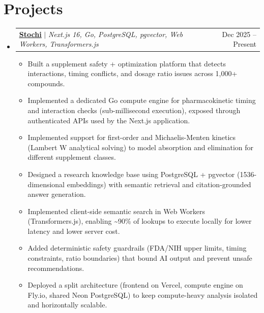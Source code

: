 \documentclass[a4paper,10pt]{article}
\makeatletter
\newcommand{\resumeItem}[1]{%
  \item\small{#1\vspace{-1pt}}%
}
\newcommand{\resumeProjectHeading}[2]{%
  \item
  \begin{tabular*}{0.97\textwidth}{l@{\extracolsep{\fill}}r}
    \small #1 & #2 \\
  \end{tabular*}\vspace{-6pt}%
}
\newcommand{\resumeItemListStart}{\begin{itemize}[itemsep=2pt]}
\newcommand{\resumeItemListEnd}{\end{itemize}\vspace{-2pt}}
\makeatother
\begin{document}
\section{Projects}
\begin{itemize}[leftmargin=0.15in, label={}]

  \resumeProjectHeading
    {\textbf{\href{https://github.com/nikitalobanov12/stochi}{\underline{Stochi}}}
    $|$ \emph{Next.js 16, Go, PostgreSQL, pgvector, Web Workers, Transformers.js}}{Dec 2025 -- Present}
  \resumeItemListStart
    \resumeItem{Built a supplement safety + optimization platform that detects interactions, timing conflicts, and dosage ratio issues across 1,000+ compounds.}
    \resumeItem{Implemented a dedicated Go compute engine for pharmacokinetic timing and interaction checks (sub-millisecond execution), exposed through authenticated APIs used by the Next.js application.}
    \resumeItem{Implemented support for first-order and Michaelis-Menten kinetics (Lambert W analytical solving) to model absorption and elimination for different supplement classes.}
    \resumeItem{Designed a research knowledge base using PostgreSQL + pgvector (1536-dimensional embeddings) with semantic retrieval and citation-grounded answer generation.}
    \resumeItem{Implemented client-side semantic search in Web Workers (Transformers.js), enabling \textasciitilde 90\% of lookups to execute locally for lower latency and lower server cost.}
    \resumeItem{Added deterministic safety guardrails (FDA/NIH upper limits, timing constraints, ratio boundaries) that bound AI output and prevent unsafe recommendations.}
    \resumeItem{Deployed a split architecture (frontend on Vercel, compute engine on Fly.io, shared Neon PostgreSQL) to keep compute-heavy analysis isolated and horizontally scalable.}
  \resumeItemListEnd


\end{itemize}
\end{document}
